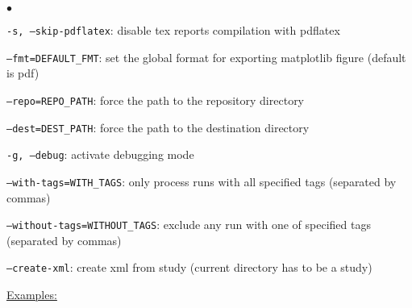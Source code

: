 \documentclass[a4paper,10pt,twoside]{csshortdoc}
\begin{document}
\begin{list}{$\bullet$}{}
\item \texttt{-s, --skip-pdflatex}: disable tex reports compilation with pdflatex
\item \texttt{--fmt=DEFAULT\_FMT}: set the global format for exporting matplotlib figure (default is pdf)
\item \texttt{--repo=REPO\_PATH}: force the path to the repository directory
\item \texttt{--dest=DEST\_PATH}: force the path to the destination directory
\item \texttt{-g, --debug}: activate debugging mode
\item \texttt{--with-tags=WITH\_TAGS}: only process runs with all specified tags (separated by commas)
\item \texttt{--without-tags=WITHOUT\_TAGS}: exclude any run with one of specified tags (separated by commas)
\item \texttt{--create-xml}: create xml from study (current directory has to be a study)
\end{list}

\underline{Examples:}
\end{document}
